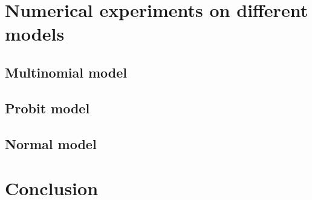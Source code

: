 \section{Numerical experiments on different models}


\subsection{Multinomial model}  %

\subsection{Probit model} %

\subsection{Normal model}


\section{Conclusion}









